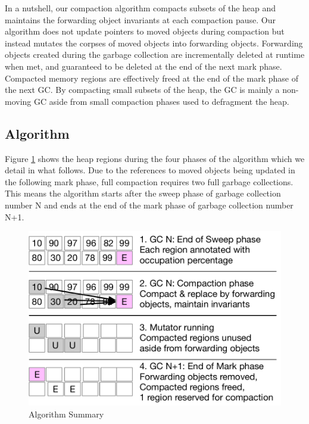 \documentclass[sigplan,10pt,screen]{acmart}\settopmatter{printfolios=true,printccs=true,printacmref=true}
\begin{document}
In a nutshell, our compaction algorithm compacts subsets of the heap and maintains the forwarding object invariants at each compaction pause. 
Our algorithm does not update pointers to moved objects during compaction but instead mutates the corpses of moved objects into forwarding objects. Forwarding objects created during the garbage collection are incrementally deleted at runtime when met, and guaranteed to be deleted at the end of the next mark phase. Compacted memory regions are effectively freed at the end of the mark phase of the next GC. By compacting small subsets of the heap, the GC is mainly a non-moving GC aside from small compaction phases used to defragment the heap.

\subsection{Algorithm}

Figure \ref{fig:Algo} shows the heap regions during the four phases of the algorithm which we detail in what follows. Due to the references to moved objects being updated in the following mark phase, full compaction requires two full garbage collections. 
This means the algorithm starts after the sweep phase of garbage collection number N and ends at the end of the mark phase of garbage collection number N+1.

\begin{figure}[bth]
		\vspace{-0.1cm}
		\includegraphics[width=.90\linewidth]{figures/SelectiveCompactFig} 
		\vspace{-0.3cm}
		\caption{Algorithm Summary\vspace{-0.3cm}}
		\label{fig:Algo}
 \end{figure}
\end{document}
